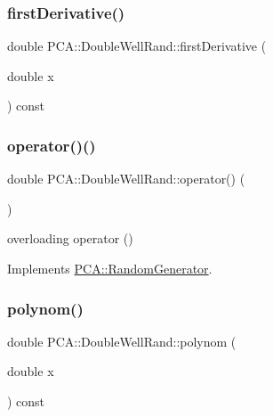 \subsubsection{\texorpdfstring{first\+Derivative()}{firstDerivative()}}
{\footnotesize\ttfamily double P\+C\+A\+::\+Double\+Well\+Rand\+::first\+Derivative (\begin{DoxyParamCaption}\item[{double}]{x }\end{DoxyParamCaption}) const\hspace{0.3cm}{\ttfamily [private]}}

\hypertarget{class_p_c_a_1_1_double_well_rand_a13beb4ae56cd6ccb1d6e4c1e2a03ff9b}{}\label{class_p_c_a_1_1_double_well_rand_a13beb4ae56cd6ccb1d6e4c1e2a03ff9b} 
\subsubsection{\texorpdfstring{operator()()}{operator()()}}
{\footnotesize\ttfamily double P\+C\+A\+::\+Double\+Well\+Rand\+::operator() (\begin{DoxyParamCaption}{ }\end{DoxyParamCaption})\hspace{0.3cm}{\ttfamily [virtual]}}



overloading operator () 



Implements \hyperlink{class_p_c_a_1_1_random_generator_a4361e39397900ae1e7b2cfa91a592509}{P\+C\+A\+::\+Random\+Generator}.

\hypertarget{class_p_c_a_1_1_double_well_rand_a345fbcb1a01172464184b418ee761442}{}\label{class_p_c_a_1_1_double_well_rand_a345fbcb1a01172464184b418ee761442} 
\subsubsection{\texorpdfstring{polynom()}{polynom()}}
{\footnotesize\ttfamily double P\+C\+A\+::\+Double\+Well\+Rand\+::polynom (\begin{DoxyParamCaption}\item[{double}]{x }\end{DoxyParamCaption}) const\hspace{0.3cm}{\ttfamily [private]}}

